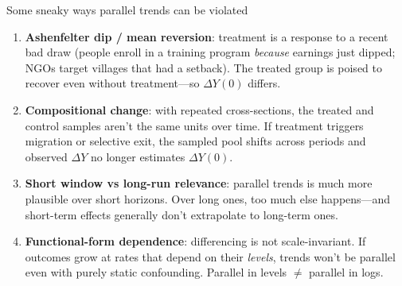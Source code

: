 \documentclass[xcolor=dvipsnames]{beamer}
\begin{document}
\begin{frame}{Some sneaky ways parallel trends can be violated}
\small
\begin{enumerate}
\footnotesize
\item<1-> \textbf{Ashenfelter dip / mean reversion}: treatment is a response to a recent bad draw (people enroll in a training program \textit{because} earnings just dipped; NGOs target villages that had a setback). The treated group is poised to recover even without treatment---so $\Delta Y(0)$ differs.
\medskip
\item<2-> \textbf{Compositional change}: with repeated cross-sections, the treated and control samples aren't the same units over time. If treatment triggers migration or selective exit, the sampled pool shifts across periods and observed $\Delta Y$ no longer estimates $\Delta Y(0)$.
\medskip
\item<3-> \textbf{Short window vs long-run relevance}: parallel trends is much more plausible over short horizons. Over long ones, too much else happens---and short-term effects generally don't extrapolate to long-term ones.
\medskip
\item<4-> \textbf{Functional-form dependence}: differencing is not scale-invariant. If outcomes grow at rates that depend on their \textit{levels}, trends won't be parallel even with purely static confounding. Parallel in levels $\neq$ parallel in logs.
\end{enumerate}

\end{frame}
\end{document}
